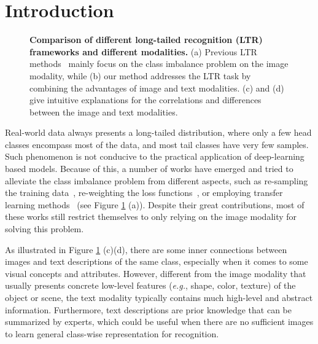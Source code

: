 \documentclass[runningheads]{llncs}
\def\eg{\emph{e.g.}}
\begin{document}
\section{Introduction}

\label{sec:intro}

\begin{figure}[t]
\centering
		\setlength{\fboxrule}{0pt}
\caption{
		\textbf{Comparison of different long-tailed recognition (LTR) frameworks and different modalities. } 
		(a) Previous LTR methods~\cite{chawla2002smote,chu2020feature,khan2017cost,cui2019class,wang2017learning,zhong2019unequal} mainly focus on the class imbalance problem on the image modality, while (b) our method addresses the LTR task by combining the advantages of image and text modalities.
		(c) and (d) give intuitive explanations for the correlations and differences between the image and text modalities.
		}
		\label{fig:moti}
\end{figure}


Real-world data always presents a long-tailed distribution, where only a few head classes encompass most of the data, and most tail classes have very few samples. Such phenomenon is not conducive to the practical application of deep-learning based models.
Because of this, a number of works have emerged and tried to alleviate the class imbalance problem from different aspects, such as re-sampling the training data~\cite{chawla2002smote,chu2020feature,shen2016relay}, re-weighting the loss functions~\cite{khan2017cost,cui2019class,lin2017focal}, or employing transfer learning methods~\cite{wang2017learning,zhong2019unequal,liu2019large} (see Figure \ref{fig:moti} (a)).
Despite their great contributions, most of these works still restrict themselves to only relying on the image modality for solving this problem. 

As illustrated in Figure \ref{fig:moti} (c)(d), there are some inner connections between images and text descriptions of the same class, especially when it comes to some visual concepts and attributes.
However, different from the image modality that usually presents concrete low-level features (\eg, shape, color, texture) of the object or scene, the text modality typically contains much high-level and abstract information.
Furthermore, text descriptions are prior knowledge that can be summarized by experts, which could be useful when there are no sufficient images to learn general class-wise representation for recognition.
\end{document}
